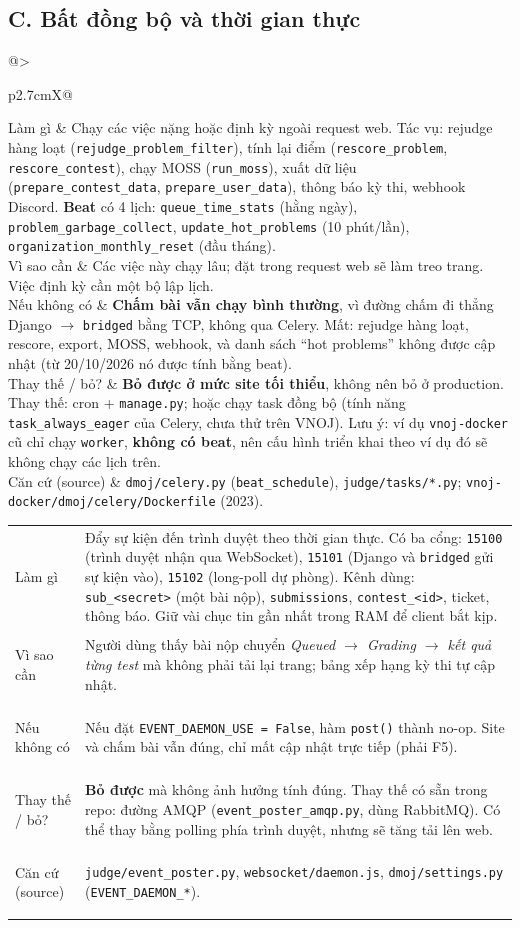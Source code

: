 \documentclass[11pt,a4paper]{article}
\makeatletter
\renewcommand{\c}[1]{\texttt{#1}}
\newcommand{\comp}[6]{%
\begin{tcolorbox}[enhanced,breakable,colback=white,colframe=black!55,boxrule=0.5pt,arc=2pt,
  title={\textbf{#1}},fonttitle=\large,left=4pt,right=4pt,top=3pt,bottom=3pt]
\begin{tabularx}{\linewidth}{@{}>{\bfseries\raggedright}p{2.7cm}X@{}}
Làm gì & #2 \\[2pt]
Vì sao cần & #3 \\[2pt]
Nếu không có & #4 \\[2pt]
Thay thế / bỏ? & #5 \\[2pt]
Căn cứ (source) & \small #6 \\
\end{tabularx}
\end{tcolorbox}}
\makeatother
\begin{document}
\subsection*{C. Bất đồng bộ và thời gian thực}

\comp{C1. Celery worker + beat}
{Chạy các việc nặng hoặc định kỳ ngoài request web. Tác vụ: rejudge hàng loạt (\c{rejudge\_problem\_filter}), tính lại điểm (\c{rescore\_problem}, \c{rescore\_contest}), chạy MOSS (\c{run\_moss}), xuất dữ liệu (\c{prepare\_contest\_data}, \c{prepare\_user\_data}), thông báo kỳ thi, webhook Discord. \textbf{Beat} có 4 lịch: \c{queue\_time\_stats} (hằng ngày), \c{problem\_garbage\_collect}, \c{update\_hot\_problems} (10 phút/lần), \c{organization\_monthly\_reset} (đầu tháng).}
{Các việc này chạy lâu; đặt trong request web sẽ làm treo trang. Việc định kỳ cần một bộ lập lịch.}
{\textbf{Chấm bài vẫn chạy bình thường}, vì đường chấm đi thẳng Django $\to$ \c{bridged} bằng TCP, không qua Celery. Mất: rejudge hàng loạt, rescore, export, MOSS, webhook, và danh sách ``hot problems'' không được cập nhật (từ 20/10/2026 nó được tính bằng beat).}
{\textbf{Bỏ được ở mức site tối thiểu}, không nên bỏ ở production. Thay thế: cron + \c{manage.py}; hoặc chạy task đồng bộ (tính năng \c{task\_always\_eager} của Celery, chưa thử trên VNOJ). Lưu ý: ví dụ \c{vnoj-docker} cũ chỉ chạy \c{worker}, \textbf{không có beat}, nên cấu hình triển khai theo ví dụ đó sẽ không chạy các lịch trên.}
{\c{dmoj/celery.py} (\c{beat\_schedule}), \c{judge/tasks/*.py}; \c{vnoj-docker/dmoj/celery/Dockerfile} (2023).}

\comp{C2. wsevent (event server, Node.js)}
{Đẩy sự kiện đến trình duyệt theo thời gian thực. Có ba cổng: \c{15100} (trình duyệt nhận qua WebSocket), \c{15101} (Django và \c{bridged} gửi sự kiện vào), \c{15102} (long-poll dự phòng). Kênh dùng: \c{sub\_<secret>} (một bài nộp), \c{submissions}, \c{contest\_<id>}, ticket, thông báo. Giữ vài chục tin gần nhất trong RAM để client bắt kịp.}
{Người dùng thấy bài nộp chuyển \emph{Queued $\to$ Grading $\to$ kết quả từng test} mà không phải tải lại trang; bảng xếp hạng kỳ thi tự cập nhật.}
{Nếu đặt \c{EVENT\_DAEMON\_USE = False}, hàm \c{post()} thành no-op. Site và chấm bài vẫn đúng, chỉ mất cập nhật trực tiếp (phải F5).}
{\textbf{Bỏ được} mà không ảnh hưởng tính đúng. Thay thế có sẵn trong repo: đường AMQP (\c{event\_poster\_amqp.py}, dùng RabbitMQ). Có thể thay bằng polling phía trình duyệt, nhưng sẽ tăng tải lên web.}
{\c{judge/event\_poster.py}, \c{websocket/daemon.js}, \c{dmoj/settings.py} (\c{EVENT\_DAEMON\_*}).}
\end{document}

